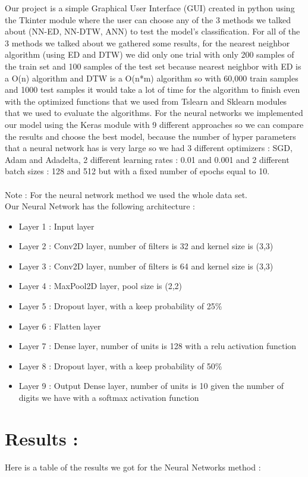 \documentclass[10pt,a4paper]{article}
\begin{document}
Our project is a simple Graphical User Interface (GUI) created in python using the Tkinter module where the user can choose any of the 3 methods we talked about (NN-ED, NN-DTW, ANN) to test the model's classification. For all of the 3 methods we talked about we gathered some results, for the nearest neighbor algorithm (using ED and DTW) we did only one trial with only 200 samples of the train set and 100 samples of the test set because nearest neighbor with ED is a O(n) algorithm and DTW is a O(n*m) algorithm so with 60,000 train samples and 1000 test samples it would take a lot of time for the algorithm to finish even with the optimized functions that we used from Tslearn and Sklearn modules that we used to evaluate the algorithms. For the neural networks we implemented our model using the Keras module with 9 different approaches so we can compare the results and choose the best model, because the number of hyper parameters that a neural network has is very large so we had 3 different optimizers : SGD, Adam and Adadelta, 2 different learning rates : 0.01 and 0.001 and 2 different batch sizes : 128 and 512 but with a fixed number of epochs equal to 10.\\\\
Note : For the neural network method we used the whole data set.\\
Our Neural Network has the following architecture :\\
\begin{itemize}
\item Layer 1 : Input layer
\item Layer 2 : Conv2D layer, number of filters is 32 and kernel size is (3,3)
\item Layer 3 : Conv2D layer, number of filters is 64 and kernel size is (3,3)
\item Layer 4 : MaxPool2D layer, pool size is (2,2)
\item Layer 5 : Dropout layer, with a keep probability of 25\%
\item Layer 6 : Flatten layer
\item Layer 7 : Dense layer, number of units is 128 with a relu activation function
\item Layer 8 : Dropout layer, with a keep probability of 50\%
\item Layer 9 : Output Dense layer, number of units is 10 given the number of digits we have with a softmax activation function
\end{itemize}

\section{Results :}
Here is a table of the results we got for the Neural Networks method :\\\\
\end{document}

